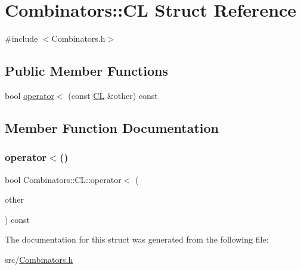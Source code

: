 \hypertarget{struct_combinators_1_1_c_l}{}\section{Combinators\+:\+:CL Struct Reference}
\label{struct_combinators_1_1_c_l}


{\ttfamily \#include $<$Combinators.\+h$>$}

\subsection*{Public Member Functions}
\begin{DoxyCompactItemize}
\item 
bool \hyperlink{struct_combinators_1_1_c_l_a81f3673cc2acbaaa9194c84352905bce}{operator$<$} (const \hyperlink{struct_combinators_1_1_c_l}{CL} \&other) const
\end{DoxyCompactItemize}


\subsection{Member Function Documentation}
\mbox{\label{struct_combinators_1_1_c_l_a81f3673cc2acbaaa9194c84352905bce}} 
\subsubsection{\texorpdfstring{operator$<$()}{operator<()}}
{\footnotesize\ttfamily bool Combinators\+::\+C\+L\+::operator$<$ (\begin{DoxyParamCaption}\item[{const \hyperlink{struct_combinators_1_1_c_l}{CL} \&}]{other }\end{DoxyParamCaption}) const\hspace{0.3cm}{\ttfamily [inline]}}



The documentation for this struct was generated from the following file\+:\begin{DoxyCompactItemize}
\item 
src/\hyperlink{_combinators_8h}{Combinators.\+h}\end{DoxyCompactItemize}
